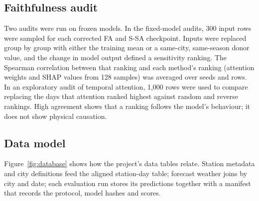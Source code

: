 \documentclass[pdflatex,sn-mathphys-num]{sn-jnl}
\begin{document}
\subsection{Faithfulness audit}\label{sec:audit}
Two audits were run on frozen models. In the fixed-model audits, 300 input rows were sampled for each corrected FA and S-SA checkpoint. Inputs were replaced group by group with either the training mean or a same-city, same-season donor value, and the change in model output defined a sensitivity ranking. The Spearman correlation between that ranking and each method's ranking (attention weights and SHAP values from 128 samples) was averaged over seeds and rows. In an exploratory audit of temporal attention, 1,000 rows were used to compare replacing the days that attention ranked highest against random and reverse rankings. High agreement shows that a ranking follows the model's behaviour; it does not show physical causation.

\subsection{Data model}
Figure~\ref{fig:database} shows how the project's data tables relate. Station metadata and city definitions feed the aligned station-day table; forecast weather joins by city and date; each evaluation run stores its predictions together with a manifest that records the protocol, model hashes and scores.
\end{document}
